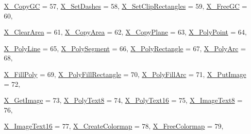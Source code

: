 \begin{DoxyCompactItemize}
\hyperlink{namespace_tao_1_1_platform_1_1_x11_a2cfd0ff14439adb84809be96fb4c7d4b}{X\_\-CopyGC} =  57, 
\hyperlink{namespace_tao_1_1_platform_1_1_x11_a2cfd0ff14439adb84809be96fb4c7d4b}{X\_\-SetDashes} =  58, 
\hyperlink{namespace_tao_1_1_platform_1_1_x11_a2cfd0ff14439adb84809be96fb4c7d4b}{X\_\-SetClipRectangles} =  59, 
\hyperlink{namespace_tao_1_1_platform_1_1_x11_a2cfd0ff14439adb84809be96fb4c7d4b}{X\_\-FreeGC} =  60, 
\par
\hyperlink{namespace_tao_1_1_platform_1_1_x11_a2cfd0ff14439adb84809be96fb4c7d4b}{X\_\-ClearArea} =  61, 
\hyperlink{namespace_tao_1_1_platform_1_1_x11_a2cfd0ff14439adb84809be96fb4c7d4b}{X\_\-CopyArea} =  62, 
\hyperlink{namespace_tao_1_1_platform_1_1_x11_a2cfd0ff14439adb84809be96fb4c7d4b}{X\_\-CopyPlane} =  63, 
\hyperlink{namespace_tao_1_1_platform_1_1_x11_a2cfd0ff14439adb84809be96fb4c7d4b}{X\_\-PolyPoint} =  64, 
\par
\hyperlink{namespace_tao_1_1_platform_1_1_x11_a2cfd0ff14439adb84809be96fb4c7d4b}{X\_\-PolyLine} =  65, 
\hyperlink{namespace_tao_1_1_platform_1_1_x11_a2cfd0ff14439adb84809be96fb4c7d4b}{X\_\-PolySegment} =  66, 
\hyperlink{namespace_tao_1_1_platform_1_1_x11_a2cfd0ff14439adb84809be96fb4c7d4b}{X\_\-PolyRectangle} =  67, 
\hyperlink{namespace_tao_1_1_platform_1_1_x11_a2cfd0ff14439adb84809be96fb4c7d4b}{X\_\-PolyArc} =  68, 
\par
\hyperlink{namespace_tao_1_1_platform_1_1_x11_a2cfd0ff14439adb84809be96fb4c7d4b}{X\_\-FillPoly} =  69, 
\hyperlink{namespace_tao_1_1_platform_1_1_x11_a2cfd0ff14439adb84809be96fb4c7d4b}{X\_\-PolyFillRectangle} =  70, 
\hyperlink{namespace_tao_1_1_platform_1_1_x11_a2cfd0ff14439adb84809be96fb4c7d4b}{X\_\-PolyFillArc} =  71, 
\hyperlink{namespace_tao_1_1_platform_1_1_x11_a2cfd0ff14439adb84809be96fb4c7d4b}{X\_\-PutImage} =  72, 
\par
\hyperlink{namespace_tao_1_1_platform_1_1_x11_a2cfd0ff14439adb84809be96fb4c7d4b}{X\_\-GetImage} =  73, 
\hyperlink{namespace_tao_1_1_platform_1_1_x11_a2cfd0ff14439adb84809be96fb4c7d4b}{X\_\-PolyText8} =  74, 
\hyperlink{namespace_tao_1_1_platform_1_1_x11_a2cfd0ff14439adb84809be96fb4c7d4b}{X\_\-PolyText16} =  75, 
\hyperlink{namespace_tao_1_1_platform_1_1_x11_a2cfd0ff14439adb84809be96fb4c7d4b}{X\_\-ImageText8} =  76, 
\par
\hyperlink{namespace_tao_1_1_platform_1_1_x11_a2cfd0ff14439adb84809be96fb4c7d4b}{X\_\-ImageText16} =  77, 
\hyperlink{namespace_tao_1_1_platform_1_1_x11_a2cfd0ff14439adb84809be96fb4c7d4b}{X\_\-CreateColormap} =  78, 
\hyperlink{namespace_tao_1_1_platform_1_1_x11_a2cfd0ff14439adb84809be96fb4c7d4b}{X\_\-FreeColormap} =  79, 

\end{DoxyCompactItemize}
